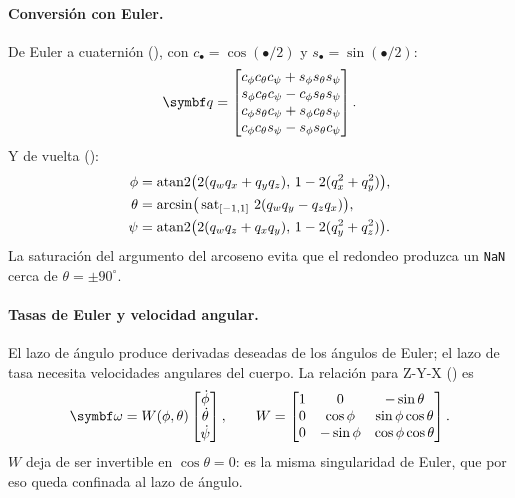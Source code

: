 \paragraph{Conversión con Euler.} De Euler a cuaternión
(), con $c_\bullet=\cos(\bullet/2)$ y
$s_\bullet=\sin(\bullet/2)$:
\begin{equation}
\vect q=\begin{bmatrix}
c_\phi c_\theta c_\psi + s_\phi s_\theta s_\psi\\
s_\phi c_\theta c_\psi - c_\phi s_\theta s_\psi\\
c_\phi s_\theta c_\psi + s_\phi c_\theta s_\psi\\
c_\phi c_\theta s_\psi - s_\phi s_\theta c_\psi
\end{bmatrix}.
\end{equation}
Y de vuelta ():
\begin{equation}
\begin{aligned}
\phi&=\operatorname{atan2}\!\big(2(q_wq_x+q_yq_z),\,1-2(q_x^2+q_y^2)\big),\\
\theta&=\arcsin\!\big(\operatorname{sat}_{[-1,1]}\,2(q_wq_y-q_zq_x)\big),\\
\psi&=\operatorname{atan2}\!\big(2(q_wq_z+q_xq_y),\,1-2(q_y^2+q_z^2)\big).
\end{aligned}
\end{equation}
La saturación del argumento del arcoseno evita que el redondeo produzca un
\texttt{NaN} cerca de $\theta=\pm90^\circ$.

\paragraph{Tasas de Euler y velocidad angular.} El lazo de ángulo produce
derivadas deseadas de los ángulos de Euler; el lazo de tasa necesita
velocidades angulares del cuerpo. La relación para Z-Y-X
() es
\begin{equation}
\vect\omega = W(\phi,\theta)\begin{bmatrix}\dot\phi\\ \dot\theta\\ \dot\psi\end{bmatrix},
\qquad
W=\begin{bmatrix}
1 & 0 & -\sin\theta\\
0 & \cos\phi & \sin\phi\cos\theta\\
0 & -\sin\phi & \cos\phi\cos\theta
\end{bmatrix}.
\label{eq:W}
\end{equation}
$W$ deja de ser invertible en $\cos\theta=0$: es la misma singularidad de
Euler, que por eso queda confinada al lazo de ángulo.

